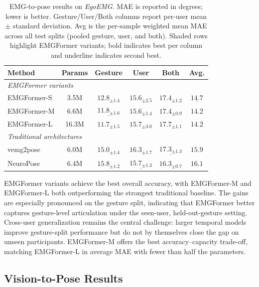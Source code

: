 \documentclass{article}
\newcommand{\dataset}{\textit{EgoEMG}}
\newcommand{\model}{EMGFormer}
\begin{document}
\begin{table}[t]
\centering
\caption{EMG-to-pose results on \dataset{}. MAE is reported in degrees; lower is better. Gesture/User/Both columns report per-user mean $\pm$ standard deviation. Avg is the per-sample weighted mean MAE across all test splits (pooled gesture, user, and both). Shaded rows highlight \model{} variants; bold indicates best per column and underline indicates second best.}
\label{tab:egoemg_emg_results}
\footnotesize
\setlength{\tabcolsep}{3.8pt}
\renewcommand{\arraystretch}{1.08}
\begin{tabular}{lccccc}
\toprule
Method & Params & Gesture & User & Both & Avg. \\
\midrule
\multicolumn{6}{l}{\textit{\model{} variants}} \\
\midrule
\model{}-S & 3.5M & $12.8_{\pm1.4}$ & $\mathbf{15.6_{\pm2.5}}$ & $17.4_{\pm1.2}$ & $\underline{14.7}$ \\
\rowcolor{green!8}
\model{}-M & 6.6M & $\underline{11.8_{\pm1.6}}$ & $\mathbf{15.6_{\pm1.4}}$ & $17.4_{\pm0.9}$ & $\mathbf{14.2}$ \\
\model{}-L & 16.3M & $\mathbf{11.7_{\pm1.5}}$ & $15.7_{\pm3.0}$ & $17.7_{\pm1.1}$ & $\mathbf{14.2}$ \\
\midrule
\multicolumn{6}{l}{\textit{Traditional architectures}} \\
\midrule
vemg2pose & 6.0M & $15.0_{\pm1.4}$ & $16.3_{\pm1.7}$ & $\underline{17.3_{\pm1.3}}$ & $15.9$ \\
NeuroPose & 6.4M & $15.8_{\pm1.2}$ & $\underline{15.7_{\pm1.3}}$ & $\mathbf{16.3_{\pm0.7}}$ & $16.1$ \\
\bottomrule
\end{tabular}
\end{table}

\model{} variants achieve the best overall accuracy, with \model{}-M and \model{}-L both outperforming the strongest traditional baseline. The gains are especially pronounced on the gesture split, indicating that \model{} better captures gesture-level articulation under the seen-user, held-out-gesture setting. Cross-user generalization remains the central challenge: larger temporal models improve gesture-split performance but do not by themselves close the gap on unseen participants. \model{}-M offers the best accuracy--capacity trade-off, matching \model{}-L in average MAE with fewer than half the parameters.

\subsection{Vision-to-Pose Results}
\end{document}
